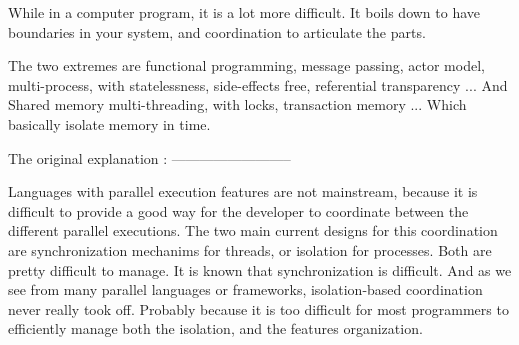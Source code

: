 While in a computer program, it is a lot more difficult.
It boils down to have boundaries in your system, and coordination to articulate the parts.

The two extremes are functional programming, message passing, actor model, multi-process, with statelessness, side-effects free, referential transparency ...
And Shared memory multi-threading, with locks, transaction memory ...
Which basically isolate memory in time.





The original explanation :
--------------------------

Languages with parallel execution features are not mainstream, because it is difficult to provide a good way for the developer to coordinate between the different parallel executions.
The two main current designs for this coordination are synchronization mechanims for threads, or isolation for processes.
Both are pretty difficult to manage.
It is known that synchronization is difficult. 
And as we see from many parallel languages or frameworks, isolation-based coordination never really took off. Probably because it is too difficult for most programmers to efficiently manage both the isolation, and the features organization.

